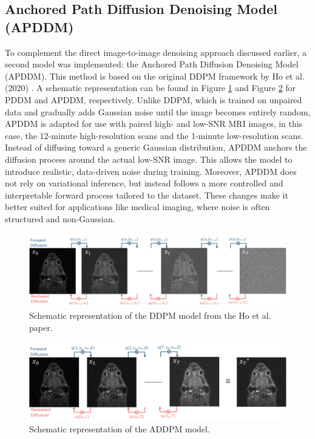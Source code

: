 \documentclass[twocolumn]{article}
\begin{document}
\subsection{Anchored Path Diffusion Denoising Model (APDDM)}
To complement the direct image-to-image denoising approach discussed earlier, a second model was implemented: the Anchored Path Diffusion Denoising Model (APDDM). 
This method is based on the original DDPM framework by Ho et al. (2020) \cite{DDPM}. 
A schematic representation can be found in Figure \ref{fig:PDDM} and Figure \ref{fig:APDDM} for PDDM and APDDM, respectively.
Unlike DDPM, which is trained on unpaired data and gradually adds Gaussian noise until the image becomes entirely random, APDDM is adapted for use with paired high- and low-SNR MRI images, in this case, the 12-minute high-resolution scans and the 1-minute low-resolution scans.
Instead of diffusing toward a generic Gaussian distribution, APDDM anchors the diffusion process around the actual low-SNR image. This allows the model to introduce realistic, data-driven noise during training.
Moreover, APDDM does not rely on variational inference, but instead follows a more controlled and interpretable forward process tailored to the dataset.
These changes make it better suited for applications like medical imaging, where noise is often structured and non-Gaussian.

\begin{figure}
    \centering
    \includegraphics[width=1\linewidth]{DDPM_model.png}
    \caption{Schematic representation of the DDPM model from the Ho et al. paper.}
    \label{fig:PDDM}
\end{figure}

\begin{figure}
    \centering
    \includegraphics[width=1\linewidth]{ADDPM_model.png}
    \caption{Schematic representation of the ADDPM model.}
    \label{fig:APDDM}
\end{figure}
\end{document}
